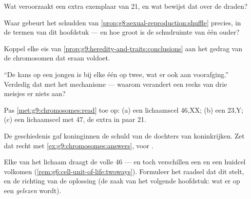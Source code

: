 \begin{exercise}[$\star$]\label{exo:g9:chromosomes:6}
Wat veroorzaakt een extra exemplaar van  21, en wat
bewijst dat over de draden?
\end{exercise}

\begin{exercise}[$\star\star$]\label{exo:g9:chromosomes:7}
Waar gebeurt het schudden van
\cref{prop:g8:sexual-reproduction:shuffle} precies, in de
termen van dit hoofdstuk --- en hoe groot is de schudruimte van
één ouder?
\end{exercise}

\begin{exercise}[$\star\star$]\label{exo:g9:chromosomes:8}
Koppel elke eis van
\cref{prop:g9:heredity-and-traits:conclusions} aan het gedrag
van de chromosomen dat eraan voldoet.
\end{exercise}

\begin{exercise}[$\star\star$]\label{exo:g9:chromosomes:9}
``De kans op een jongen is bij elke  één op twee, wat
er ook aan voorafging.'' Verdedig dat met het mechanisme ---
waarom verandert een reeks van drie meisjes er niets aan?
\end{exercise}

\begin{exercise}[$\star\star$]\label{exo:g9:chromosomes:10}
Pas \cref{met:g9:chromosomes:read} toe op: (a) een lichaamscel
46,XX; (b) een  23,Y; (c) een lichaamscel met 47,
de extra in paar 21.
\end{exercise}

\begin{exercise}[$\star\star$]\label{exo:g9:chromosomes:11}
De geschiedenis gaf koninginnen de schuld van de dochters van
koninkrijken. Zet dat recht met \cref{ex:g9:chromosomes:answers},
 voor .
\end{exercise}

\begin{exercise}[$\star\star\star$]\label{exo:g9:chromosomes:12}
Elke  van het lichaam draagt de volle 46 --- en toch
verschillen een  en een huidcel volkomen
(\cref{rem:g6:cell-unit-of-life:twoways}). Formuleer het
raadsel dat dit stelt, en de richting van de oplossing (de zaak
van het volgende hoofdstuk: wat er op een 
\emph{gelezen} wordt).
\end{exercise}

